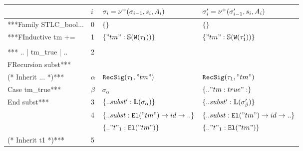 \begin{table}[]
  \begin{tabular}{|l|l|l|l|}
  \hline
   & $i$ & $\sigma_i = \nu^+({\sigma_{i-1}},{s_i},{A_i})$ & $\sigma_i' = \nu^+({\sigma_{i-1}'},{s_i},{A_i})$ \\ \hline
  ***Family STLC\_bool...                  & 0                   & $\{\}$                                   & $\{\}$                                   \\ \hline
  ***FInductive tm +=                      & 1                   & $\{"tm" : \mathbb{S}({\texttt{W}({\tau_1})})\}$       & $\{"tm" : \mathbb{S}({\texttt{W}({\tau_1'})})\}$      \\ \hline
                                           &                     &                                          &                                          \\
  \multirow{-2}{*}{*** .. | tm\_true | ..} & \multirow{-2}{*}{2} &                                          &                                          \\ \hline
  FRecursion subst***                      &                     &                                          &                                          \\ \hline
  \rowcolor[HTML]{E0D7D7} 
  (* Inherit ... *)***                     & $\alpha$            & $\texttt{RecSig}({\tau_1},{"tm"})$                 & $\texttt{RecSig}({\tau_1},{"tm"})$                 \\ \hline
  \rowcolor[HTML]{E0D7D7} 
  Case tm\_true***                         & $\beta$             & $\sigma_{\alpha}$                        & $\{.. "tm:true": \}$                     \\ \hline
  End subst***                             & 3                   & $\{.. subst' : \mathbb{L}({\sigma_\alpha})\}$   & $\{.. subst' : \mathbb{L}({\sigma_\beta'})\}$   \\ \hline
                                           & 4                   & $\{.. subst : \texttt{El}({"tm"}) \to id \to ..\}$ & $\{.. subst : \texttt{El}({"tm"}) \to id \to ..\}$ \\ \hline
                                           &                     & $\{.. "t"_1 : \texttt{El}({"tm"})\}$               & $\{.. "t"_1 : \texttt{El}({"tm"})\}$               \\
  \multirow{-2}{*}{(* Inherit t1 *)***}    & \multirow{-2}{*}{5} &                                          &                                          \\ \hline
  \end{tabular}
  \end{table}


